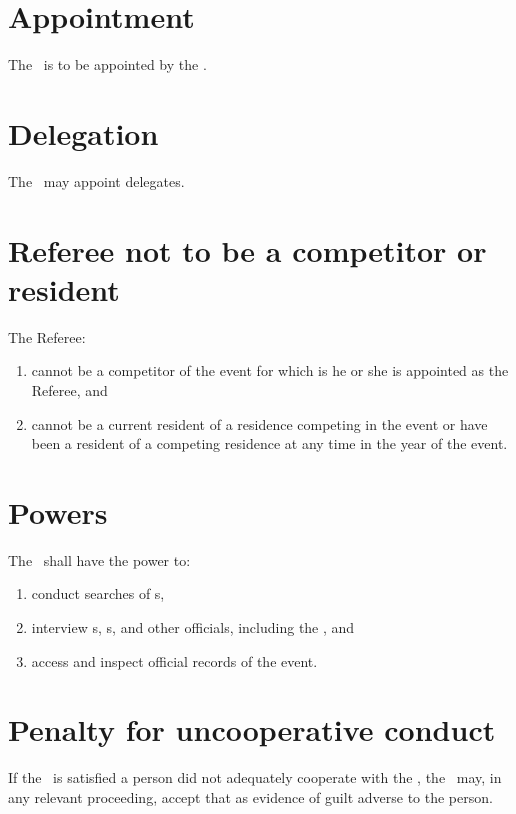 \documentclass[12pt]{report}
\begin{document}
  \section{Appointment}
  \begin{fenumerate}
    \item The \Referee\ is to be appointed by the \RaceDirector.
  \end{fenumerate}
  \section{Delegation}
  \begin{fenumerate}
    \item The \Referee\ may appoint delegates.
  \end{fenumerate}
  \section{Referee not to be a competitor or resident}
  \begin{fenumerate}
  \item
  The Referee:
  \begin{enumerate}
    \item cannot be a competitor of the event for which is he or she is appointed as the Referee, and
    \item cannot be a current resident of a residence competing in the event or have been a resident of a competing residence at any time in the year of the event.
  \end{enumerate}
  \end{fenumerate}
  \section{Powers}
  \begin{fenumerate}
    \item The \Referee\ shall have the power to:
    \begin{enumerate}
      \item conduct searches of \competitor s,
      \item interview \competitor s, \spectator s, and other officials, including the \RaceDirector, and
      \item access and inspect official records of the event.
    \end{enumerate}
  \end{fenumerate}
  \section{Penalty for uncooperative conduct}
  \begin{fenumerate}
    \item If the \Tribunal\ is satisfied a person did not adequately cooperate with the \Referee, the \Tribunal\ may, in any relevant proceeding, accept that as evidence of guilt adverse to the person.
  \end{fenumerate}
\end{document}
